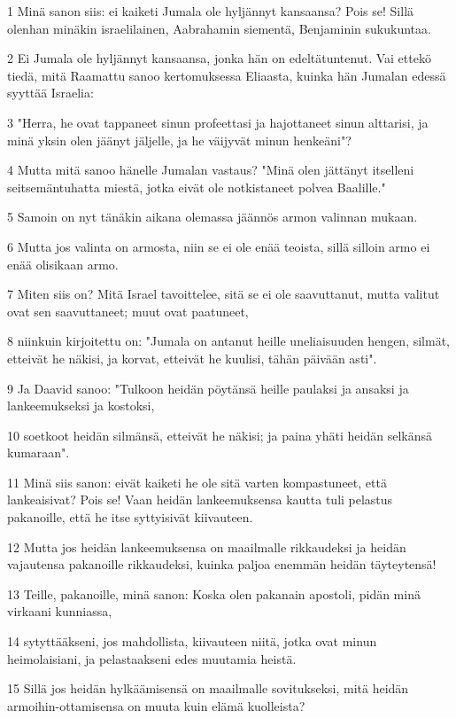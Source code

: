 \par 1 Minä sanon siis: ei kaiketi Jumala ole hyljännyt kansaansa? Pois se! Sillä olenhan minäkin israelilainen, Aabrahamin siementä, Benjaminin sukukuntaa.
\par 2 Ei Jumala ole hyljännyt kansaansa, jonka hän on edeltätuntenut. Vai ettekö tiedä, mitä Raamattu sanoo kertomuksessa Eliaasta, kuinka hän Jumalan edessä syyttää Israelia:
\par 3 "Herra, he ovat tappaneet sinun profeettasi ja hajottaneet sinun alttarisi, ja minä yksin olen jäänyt jäljelle, ja he väijyvät minun henkeäni"?
\par 4 Mutta mitä sanoo hänelle Jumalan vastaus? "Minä olen jättänyt itselleni seitsemäntuhatta miestä, jotka eivät ole notkistaneet polvea Baalille."
\par 5 Samoin on nyt tänäkin aikana olemassa jäännös armon valinnan mukaan.
\par 6 Mutta jos valinta on armosta, niin se ei ole enää teoista, sillä silloin armo ei enää olisikaan armo.
\par 7 Miten siis on? Mitä Israel tavoittelee, sitä se ei ole saavuttanut, mutta valitut ovat sen saavuttaneet; muut ovat paatuneet,
\par 8 niinkuin kirjoitettu on: "Jumala on antanut heille uneliaisuuden hengen, silmät, etteivät he näkisi, ja korvat, etteivät he kuulisi, tähän päivään asti".
\par 9 Ja Daavid sanoo: "Tulkoon heidän pöytänsä heille paulaksi ja ansaksi ja lankeemukseksi ja kostoksi,
\par 10 soetkoot heidän silmänsä, etteivät he näkisi; ja paina yhäti heidän selkänsä kumaraan".
\par 11 Minä siis sanon: eivät kaiketi he ole sitä varten kompastuneet, että lankeaisivat? Pois se! Vaan heidän lankeemuksensa kautta tuli pelastus pakanoille, että he itse syttyisivät kiivauteen.
\par 12 Mutta jos heidän lankeemuksensa on maailmalle rikkaudeksi ja heidän vajautensa pakanoille rikkaudeksi, kuinka paljoa enemmän heidän täyteytensä!
\par 13 Teille, pakanoille, minä sanon: Koska olen pakanain apostoli, pidän minä virkaani kunniassa,
\par 14 sytyttääkseni, jos mahdollista, kiivauteen niitä, jotka ovat minun heimolaisiani, ja pelastaakseni edes muutamia heistä.
\par 15 Sillä jos heidän hylkäämisensä on maailmalle sovitukseksi, mitä heidän armoihin-ottamisensa on muuta kuin elämä kuolleista?
